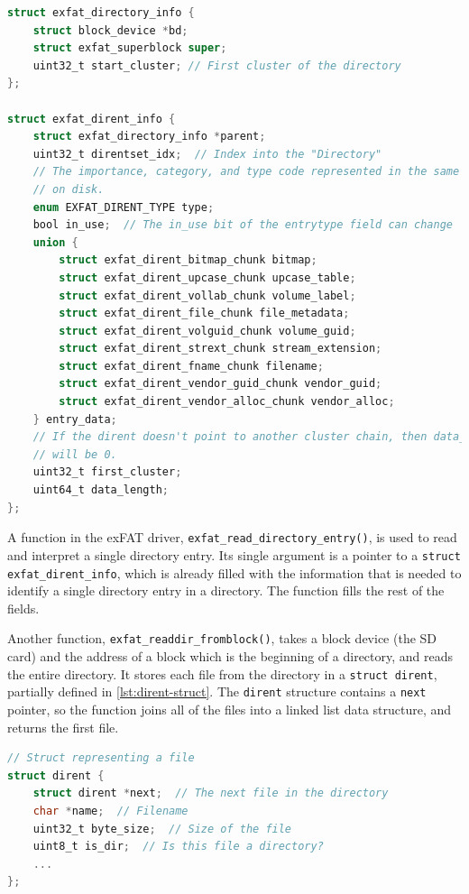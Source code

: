 \documentclass{article}
\begin{document}
\begin{lstlisting}[language=C,
                   caption={The structures which describe directories and
                   directory entries on an exFAT volume},
                   float,
                   label={lst:exfat-dirent-structs}]
struct exfat_directory_info {
    struct block_device *bd;
    struct exfat_superblock super;
    uint32_t start_cluster; // First cluster of the directory
};

struct exfat_dirent_info {
    struct exfat_directory_info *parent;
    uint32_t direntset_idx;  // Index into the "Directory"
    // The importance, category, and type code represented in the same way as
    // on disk.
    enum EXFAT_DIRENT_TYPE type;
    bool in_use;  // The in_use bit of the entrytype field can change
    union {
        struct exfat_dirent_bitmap_chunk bitmap;
        struct exfat_dirent_upcase_chunk upcase_table;
        struct exfat_dirent_vollab_chunk volume_label;
        struct exfat_dirent_file_chunk file_metadata;
        struct exfat_dirent_volguid_chunk volume_guid;
        struct exfat_dirent_strext_chunk stream_extension;
        struct exfat_dirent_fname_chunk filename;
        struct exfat_dirent_vendor_guid_chunk vendor_guid;
        struct exfat_dirent_vendor_alloc_chunk vendor_alloc;
    } entry_data;
    // If the dirent doesn't point to another cluster chain, then data_length
    // will be 0.
    uint32_t first_cluster;
    uint64_t data_length;
};
\end{lstlisting}

A function in the exFAT driver, \verb!exfat_read_directory_entry()!, is used to
read and interpret a single directory entry. Its single argument is a pointer
to a \verb!struct exfat_dirent_info!, which is already filled with the
information that is needed to identify a single directory entry in a directory.
The function fills the rest of the fields.

Another function, \verb!exfat_readdir_fromblock()!, takes a block device (the
SD card) and the address of a block which is the beginning of a directory, and
reads the entire directory. It stores each file from the directory in a
\verb!struct dirent!, partially defined in \autoref{lst:dirent-struct}. The
\verb!dirent! structure contains a \verb!next! pointer, so the function joins
all of the files into a linked list data structure, and returns the first file.

\begin{lstlisting}[language=C, caption={The dirent struct, which stores
                   information about files}, float, label={lst:dirent-struct}]
// Struct representing a file
struct dirent {
    struct dirent *next;  // The next file in the directory
    char *name;  // Filename
    uint32_t byte_size;  // Size of the file
    uint8_t is_dir;  // Is this file a directory?
    ...
};
\end{lstlisting}
\end{document}

